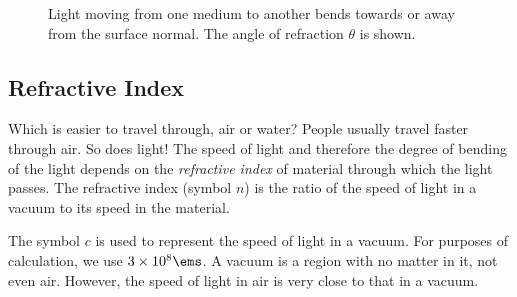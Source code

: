 \begin{figure}[htbp]
\begin{center}
\caption{Light moving from one medium to another bends towards or away from the surface normal. The angle of refraction $\theta$ is shown.}
\label{refraction:ld}
\end{center}
\end{figure}

\subsection{Refractive Index}
Which is easier to travel through, air or water? People usually travel faster through air. So does light! The speed of light and therefore the degree of bending of the light depends on the \textit{refractive index} of material through which the light passes. The refractive index (symbol $n$) is the ratio of the speed of light in a vacuum to its speed in the material.


\begin{IFact}
{The symbol $c$ is used to represent the speed of light in a vacuum.
For purposes of calculation, we use $3 \times 10^8 \ems$. A vacuum is a region with no matter in it, not even air. However, the speed of light in air is very close to that in a vacuum.}
\end{IFact}

